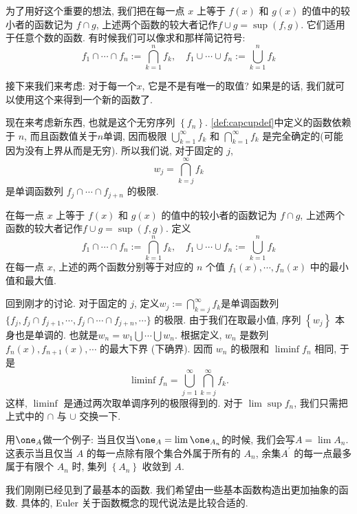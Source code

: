 为了用好这个重要的想法, 我们把在每一点 $x$ 上等于 $f(x)$ 和 $g(x)$ 的值中的较小者的函数记为 $f \cap g$, 上述两个函数的较大者记作$f \cup g=\sup (f, g)$. 它们适用于任意个数的函数. 有时候我们可以像求和那样简记符号: 
$$
f_1 \cap \cdots \cap f_n:=\bigcap_{k=1}^n f_k, \quad f_1 \cup \cdots \cup f_n:=\bigcup_{k=1}^n f_k 
$$

接下来我们来考虑: 对于每一个$x$, 它是不是有唯一的取值? 如果是的话, 我们就可以使用这个来得到一个新的函数了. 

现在来考虑新东西, 也就是这个无穷序列 $\left\{f_n\right\}$. \cref{def:capcupdef}中定义的函数依赖于 $n$, 而且函数值关于$n$单调, 因而极限 $\bigcup_{k=1}^{\infty} f_k$ 和 $\bigcap_{k=1}^{\infty} f_k$ 是完全确定的(可能因为没有上界从而是无穷). 所以我们说, 对于固定的 $j$,
$$
w_j=\bigcap_{k=j}^{\infty} f_k
$$
是单调函数列 $f_j \cap \cdots \cap f_{j+n}$ 的极限. 

\begin{definition}
    在每一点 $x$ 上等于 $f(x)$ 和 $g(x)$ 的值中的较小者的函数记为 $f \cap g$, 上述两个函数的较大者记作$f \cup g=\sup (f, g)$.
    \label{def:capcupdef}
    定义
    $$
f_1 \cap \cdots \cap f_n:=\bigcap_{k=1}^n f_k, \quad f_1 \cup \cdots \cup f_n:=\bigcup_{k=1}^n f_k 
$$
在每一点 $x$, 上述的两个函数分别等于对应的 $n$ 个值 $f_1(x), \cdots, f_n(x)$ 中的最小值和最大值.  
\end{definition}

回到刚才的讨论. 对于固定的 $j$, 定义$w_j:=\bigcap_{k=j}^{\infty} f_k$是单调函数列 $\{f_j, f_j\cap f_{j+1},\cdots,f_j \cap \cdots \cap f_{j+n}, \cdots\}$ 的极限. 由于我们在取最小值, 序列 $\left\{w_j\right\}$ 本身也是单调的. 也就是$w_n=w_1 \bigcup \cdots \bigcup w_n$. 根据定义, $w_n$ 是数列 $f_n(x), f_{n+1}(x), \cdots$ 的最大下界 (下确界). 因而 $w_n$ 的极限和 $\liminf f_n$ 相同, 于是
$$
\liminf f_n=\bigcup_{j=1}^{\infty} \bigcap_{k=j}^{\infty} f_k .
$$
这样, $\liminf$ 是通过两次取单调序列的极限得到的. 对于 $\lim \sup f_n$, 我们只需把上式中的 $\cap$ 与 $\cup$ 交换一下.

\begin{example}
    用$\one_A$做一个例子: 当且仅当$\one_A=\lim\one_{A_n}$的时候, 我们会写$A=\lim A_n$. 这表示当且仅当 $A$ 的每一点除有限个集合外属于所有的 $A_n$, 余集$A^{\prime}$ 的每一点最多属于有限个 $A_n$ 时, 集列 $\left\{A_n\right\}$ 收敛到 $A$.
\end{example}

我们刚刚已经见到了最基本的函数. 我们希望由一些基本函数构造出更加抽象的函数. 具体的, Euler
关于函数概念的现代说法是比较合适的. 

